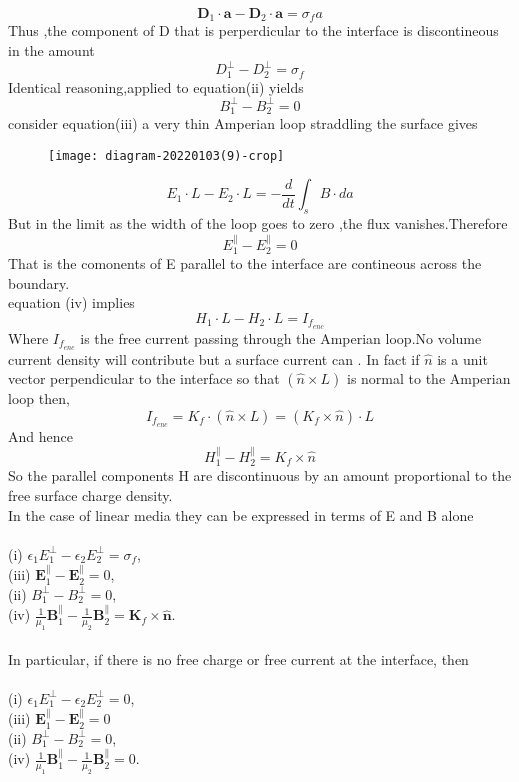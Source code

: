 $$\mathbf{D}_{1} \cdot \mathbf{a}-\mathbf{D}_{2} \cdot \mathbf{a}=\sigma_{f} a$$
Thus ,the component of D that is perperdicular to the interface is discontineous in the amount \\
$$D_{1}^{\perp}-D_{2}^{\perp}=\sigma_{f}$$
Identical reasoning,applied to equation(ii) yields\\
$$B_1^{\perp}-B_2^{\perp}=0$$
consider equation(iii) a very thin Amperian loop straddling the surface gives\\
\begin{figure}[H]
	\centering
	\texttt{[image: diagram-20220103(9)-crop]}
	\caption{}
	\label{}
\end{figure}
$$E_1\cdot L-E_2\cdot L=-\frac{d}{dt} \int_{s} B\cdot da$$
But in the limit as the width of the loop goes to zero ,the flux vanishes.Therefore\\
$$E_1^{\parallel}-E_2^{\parallel}=0$$
That is the comonents of E parallel to the interface are contineous across the boundary.\\
equation (iv)  implies \\
$$H_1 \cdot L-H_2\cdot L=I_{f_{enc}}$$
Where $I_{f_{enc}}$ is the free current passing through the Amperian loop.No volume current density will contribute but a surface current can . In fact if $\hat{n}$ is a unit vector perpendicular to the interface so that $(\hat{n}\times L)$ is normal to the Amperian loop then,
$$I_{f_{enc}}=K_f \cdot (\hat{n}\times L)=(K_f\times \hat{n})\cdot L$$
And hence $$H_1^{\parallel}-H_2^{\parallel}=K_f\times \hat{n}$$
So the parallel components  H are discontinuous by an amount proportional to the free surface charge density.\\
In the case of linear media they can be expressed in terms of E and B alone \\\\
(i) $\epsilon_{1} E_{1}^{\perp}-\epsilon_{2} E_{2}^{\perp}=\sigma_{f}$,\\
(iii) $\mathbf{E}_{1}^{\|}-\mathbf{E}_{2}^{\|}=0$,\\
(ii) $B_{1}^{\perp}-B_{2}^{\perp}=0$,\\
(iv) $\frac{1}{\mu_{1}} \mathbf{B}_{1}^{\|}-\frac{1}{\mu_{2}} \mathbf{B}_{2}^{\|}=\mathbf{K}_{f} \times \hat{\mathbf{n}}$.\\\\
In particular, if there is no free charge or free current at the interface, then \\\\
(i) $\epsilon_{1} E_{1}^{\perp}-\epsilon_{2} E_{2}^{\perp}=0$,\\
(iii) $\mathbf{E}_{1}^{\|}-\mathbf{E}_{2}^{\|}=0$\\
(ii) $B_{1}^{\perp}-B_{2}^{\perp}=0$,\\
(iv) $\frac{1}{\mu_{1}} \mathbf{B}_{1}^{\|}-\frac{1}{\mu_{2}} \mathbf{B}_{2}^{\|}=0$.

